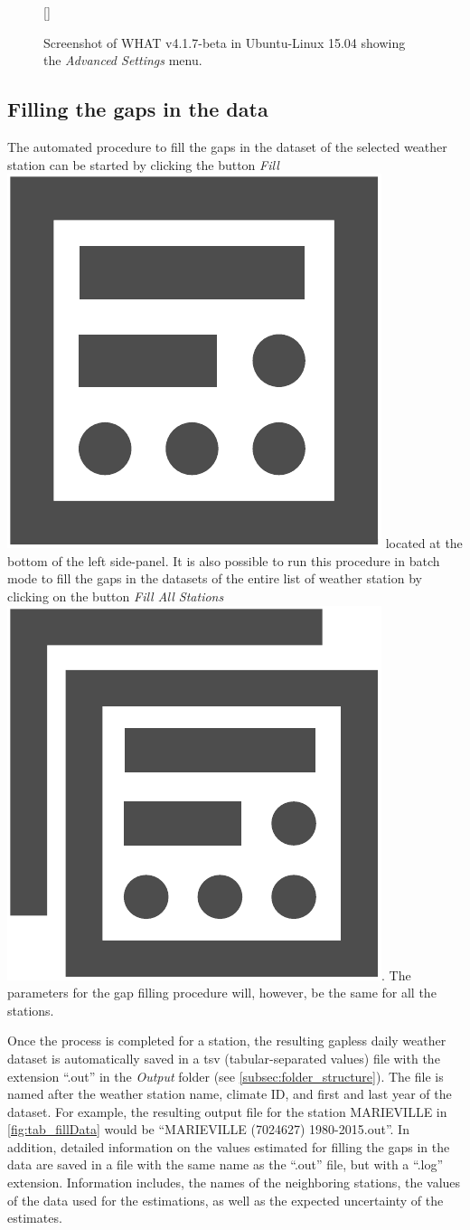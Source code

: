 \documentclass[WHATMANUAL.tex]{subfiles}
\begin{document}
\begin{figure}[!ht]
    \setlength{\fboxsep}{0pt}
    [\FBwidth]
	{
	 \caption{Screenshot of WHAT v4.1.7-beta in Ubuntu-Linux 15.04 showing the \emph{Advanced Settings} menu.}
	 \label{fig:adv_settings}
	}
	{
	}
\end{figure}

\subsection{Filling the gaps in the data}\label{subsec:filling_the_gaps}

The automated procedure to fill the gaps in the dataset of the selected weather station can be started by clicking the button \emph{Fill}~{\includegraphics[height=2ex]{img/fill_data}} located at the bottom of the left side-panel. It is also possible to run this procedure in batch mode to fill the gaps in the datasets of the entire list of weather station by clicking on the button \emph{Fill All Stations}~{\includegraphics[height=2ex]{img/fill_all_data}}. The parameters for the gap filling procedure will, however, be the same for all the stations.

Once the process is completed for a station, the resulting gapless daily weather dataset is automatically saved in a tsv (tabular-separated values) file with the extension ``.out'' in the \emph{Output} folder (see \cref{subsec:folder_structure}). The file is named after the weather station name, climate ID, and first and last year of the dataset. For example, the resulting output file for the station MARIEVILLE in \cref{fig:tab_fillData} would be ``MARIEVILLE (7024627) 1980-2015.out''.  In addition, detailed information on the values estimated for filling the gaps in the data are saved in a file with the same name as the ``.out'' file, but with a ``.log'' extension. Information includes, the names of the neighboring stations, the values of the data used for the estimations, as well as the expected uncertainty of the estimates.
\end{document}
